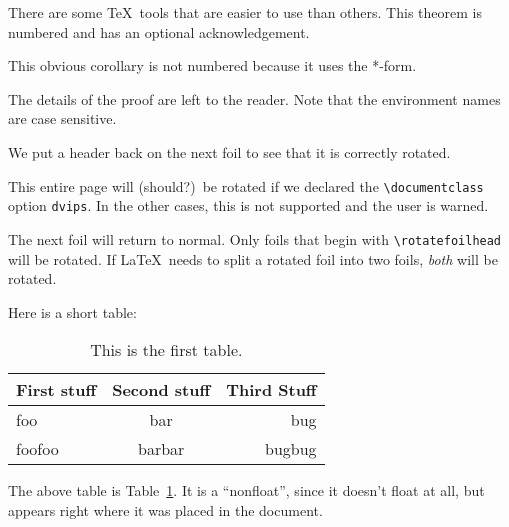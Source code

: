 \documentclass[17pt,fleqn,dvips]{foils}
\begin{document}

\begin{Theorem}[TUG'92]
There are some \TeX\ tools that are easier to use than others.  This
theorem is numbered and has an optional acknowledgement.
\end{Theorem}

\begin{Corollary*}
This obvious corollary is not numbered because it uses the *-form.
\end{Corollary*}

\begin{Proof}
The details of the proof are left to the reader.  Note that the
environment names are case sensitive.
\end{Proof}

We put a header back on the next foil to see that it is correctly
rotated.


This entire page will (should?)~be rotated if we declared the
\verb|\documentclass| option \texttt{dvips}.   In the other cases,
this is not supported and the user is warned.

The next foil will return to normal.  Only foils that begin with
\verb|\rotatefoilhead| will be rotated.  If \LaTeX\ needs to split a
rotated foil into two foils, \emph{both} will be rotated.

\leftheader{}

Here is a short table:

\begin{table}
\begin{center}
\begin{tabular}{|l|c|r|} \hline
First stuff & Second stuff & Third Stuff \\ \hline\hline
foo & bar & bug \\ \hline
foofoo & barbar & bugbug \\ \hline
\end{tabular}
\caption{\label{tab:one}This is the first table.}
\end{center}
\end{table}

The above table is Table~\ref{tab:one}.  It is a ``nonfloat'', since
it doesn't float at all, but appears right where it was placed in the
document.

\end{document}
